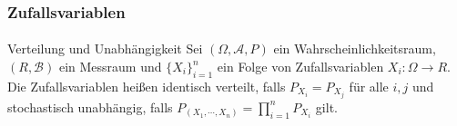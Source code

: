 \documentclass{beamer}
\begin{document}
\begin{frame}
    \frametitle{Zufallsvariablen}
\framesubtitle{}
\begin{block}{Verteilung und Unabhängigkeit}
Sei $(\Omega, \mathcal{A}, P)$ ein Wahrscheinlichkeitsraum, $(R, \mathcal{B})$ ein Messraum  und
 $\{X_i\}_{i=1}^n$ ein Folge von Zufallsvariablen   $X_i :  \Omega \to R$.
Die Zufallsvariablen heißen identisch verteilt, falls
 $P_{X_i} = P_{X_j}$ für alle $i,j$  und
stochastisch unabhängig, falls
 $P_{(X_1, \cdots ,X_n)} = \prod_{i=1}^n P_{X_i}$ gilt. 
\end{block}
 \end{frame}
\end{document}
